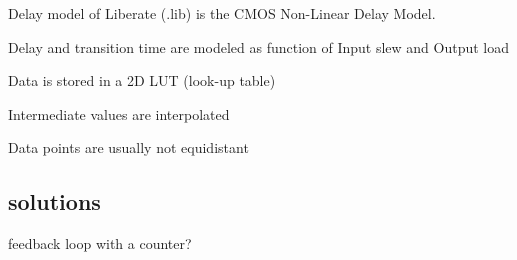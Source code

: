Delay model of Liberate (.lib) is the CMOS Non-Linear Delay Model.
\begin{s_itemize}
\item Delay and transition time are modeled as function of Input slew and Output load
\item Data is stored in a 2D LUT (look-up table)
\item Intermediate values are interpolated
\item Data points are usually not equidistant
\end{s_itemize}




\subsection*{solutions}
feedback loop with a counter?